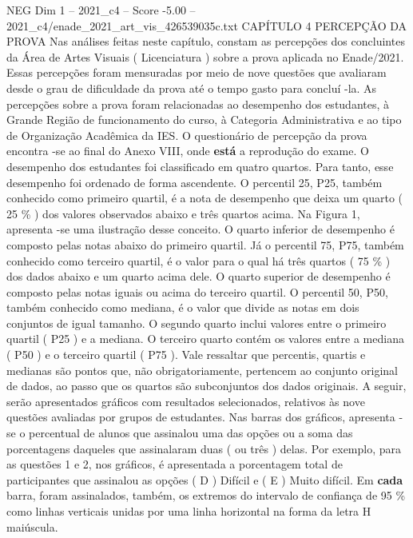 \begin{textsample}{NEG Dim 1 – 2021\_c4 – Score -5.00 – 2021\_c4/enade\_2021\_art\_vis\_426539035c.txt}  \label{ex:f1_neg_069}
CAPÍTULO 4 PERCEPÇÃO DA PROVA Nas análises feitas neste capítulo, constam as percepções dos concluintes da Área de Artes Visuais ( Licenciatura ) sobre a prova aplicada no Enade/2021.
Essas percepções foram mensuradas por meio de nove questões que avaliaram desde o grau de dificuldade da prova até o tempo gasto para concluí -la.
As percepções sobre a prova foram relacionadas ao desempenho dos estudantes, à Grande Região de funcionamento do curso, à Categoria Administrativa e ao tipo de Organização Acadêmica da IES.
O questionário de percepção da prova encontra -se ao final do Anexo VIII, onde \textbf{está} a reprodução do exame.
O desempenho dos estudantes foi classificado em quatro quartos.
Para tanto, esse desempenho foi ordenado de forma ascendente.
O percentil 25, P25, também conhecido como primeiro quartil, é a nota de desempenho que deixa um quarto ( 25 \% ) dos valores observados abaixo e três quartos acima.
Na Figura 1, apresenta -se uma ilustração desse conceito.
O quarto inferior de desempenho é composto pelas notas abaixo do primeiro quartil.
Já o percentil 75, P75, também conhecido como terceiro quartil, é o valor para o qual há três quartos ( 75 \% ) dos dados abaixo e um quarto acima dele.
O quarto superior de desempenho é composto pelas notas iguais ou acima do terceiro quartil.
O percentil 50, P50, também conhecido como mediana, é o valor que divide as notas em dois conjuntos de igual tamanho.
O segundo quarto inclui valores entre o primeiro quartil ( P25 ) e a mediana.
O terceiro quarto contém os valores entre a mediana ( P50 ) e o terceiro quartil ( P75 ).
Vale ressaltar que percentis, quartis e medianas são pontos que, não obrigatoriamente, pertencem ao conjunto original de dados, ao passo que os quartos são subconjuntos dos dados originais.
A seguir, serão apresentados gráficos com resultados selecionados, relativos às nove questões avaliadas por grupos de estudantes.
Nas barras dos gráficos, apresenta -se o percentual de alunos que assinalou uma das opções ou a soma das porcentagens daqueles que assinalaram duas ( ou três ) delas.
Por exemplo, para as questões 1 e 2, nos gráficos, é apresentada a porcentagem total de participantes que assinalou as opções ( D ) Difícil e ( E ) Muito difícil.
Em \textbf{cada} barra, foram assinalados, também, os extremos do intervalo de confiança de 95 \% como linhas verticais unidas por uma linha horizontal na forma da letra H maiúscula.

\end{textsample}

